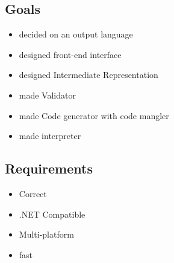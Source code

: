 \subsection{Goals}
\begin{itemize}
    \item decided on an output language
    \item designed front-end interface
    \item designed Intermediate Representation
    \item made Validator
    \item made Code generator with code mangler
    \item made interpreter
\end{itemize}

\subsection{Requirements}
\begin{itemize}
    \item Correct
    \item .NET Compatible
    \item Multi-platform
    \item fast
\end{itemize}
